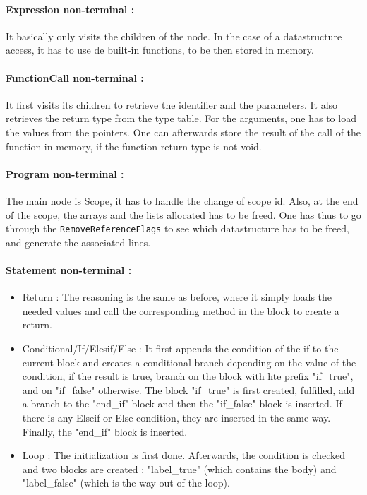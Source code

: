 \documentclass[a4paper,11pt]{article}
\begin{document}
\paragraph{Expression non-terminal :} It basically only visits the children of the node. In the case of a datastructure access, it has to use de built-in functions, to be then stored in memory.

\paragraph{FunctionCall non-terminal :} It first visits its children to retrieve the identifier and the parameters. It also retrieves the return type from the type table. For the arguments, one has to load the values from the pointers. One can afterwards store the result of the call of the function in memory, if the function return type is not void.

\paragraph{Program non-terminal :} The main node is Scope, it has to handle the change of scope id. Also, at the end of the scope, the arrays and the lists allocated has to be freed. One has thus to go through the \texttt{RemoveReferenceFlags} to see which datastructure has to be freed, and generate the associated lines.

\paragraph{Statement non-terminal :}

\begin{itemize}
	\item Return : The reasoning is the same as before, where it simply loads the needed values and call the corresponding method in the block to create a return.
	\item Conditional/If/Elesif/Else : It first appends the condition of the if to the current block and creates a conditional branch depending on the value of the condition, if the result is true, branch on the block with hte prefix "if\_true", and on "if\_false" otherwise. The block "if\_true" is first created, fulfilled, add a branch to the "end\_if" block and then the "if\_false" block is inserted. If there is any Elseif or Else condition, they are inserted in the same way. Finally, the "end\_if" block is inserted.
	\item Loop : The initialization is first done. Afterwards, the condition is checked and two blocks are created : "label\_true" (which contains the body) and "label\_false" (which is the way out of the loop). 
\end{itemize}
\end{document}
